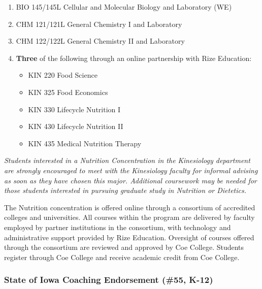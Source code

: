 \documentclass[
  letterpaper,
]{scrbook}
\providecommand{\tightlist}{%
  \setlength{\itemsep}{0pt}\setlength{\parskip}{0pt}}
\begin{document}
\begin{enumerate}
\def\labelenumi{\arabic{enumi}.}
\tightlist
\item
  BIO 145/145L Cellular and Molecular Biology and Laboratory (WE)\\
\item
  CHM 121/121L General Chemistry I and Laboratory\\
\item
  CHM 122/122L General Chemistry II and Laboratory\\
\item
  \textbf{Three} of the following through an online partnership with
  Rize Education:

  \begin{itemize}
  \tightlist
  \item
    KIN 220 Food Science\\
  \item
    KIN 325 Food Economics\\
  \item
    KIN 330 Lifecycle Nutrition I\\
  \item
    KIN 430 Lifecycle Nutrition II\\
  \item
    KIN 435 Medical Nutrition Therapy
  \end{itemize}
\end{enumerate}

\emph{Students interested in a Nutrition Concentration in the
Kinesiology department are strongly encouraged to meet with the
Kinesiology faculty for informal advising as soon as they have chosen
this major. Additional coursework may be needed for those students
interested in pursuing graduate study in Nutrition or Dietetics.}

The Nutrition concentration is offered online through a consortium of
accredited colleges and universities. All courses within the program are
delivered by faculty employed by partner institutions in the consortium,
with technology and administrative support provided by Rize Education.
Oversight of courses offered through the consortium are reviewed and
approved by Coe College. Students register through Coe College and
receive academic credit from Coe College.

\subsubsection{State of Iowa Coaching Endorsement (\#55,
K-12)}\label{state-of-iowa-coaching-endorsement-55-k-12}
\end{document}
